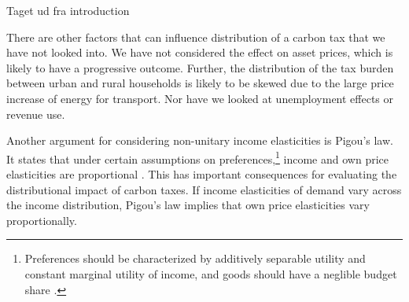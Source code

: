 Taget ud fra introduction

There are other factors that can influence distribution of a carbon tax that we have not looked into. We have not considered the effect on asset prices, which is likely to have a progressive outcome. Further, the distribution of the tax burden between urban and rural households is likely to be skewed due to the large price increase of energy for transport. Nor have we looked at unemployment effects or revenue use.

Another argument for considering non-unitary income elasticities is Pigou's law. It states that under certain assumptions on preferences,\footnote{Preferences should be characterized by additively separable utility and constant marginal utility of income, and goods should have a neglible budget share \citep{snow2015pigouslaw}.} income and own price elasticities are proportional \citep{snow2015pigouslaw}. This has important consequences for evaluating the distributional impact of carbon taxes. If income elasticities of demand vary across the income distribution, Pigou's law implies that own price elasticities vary proportionally. 

